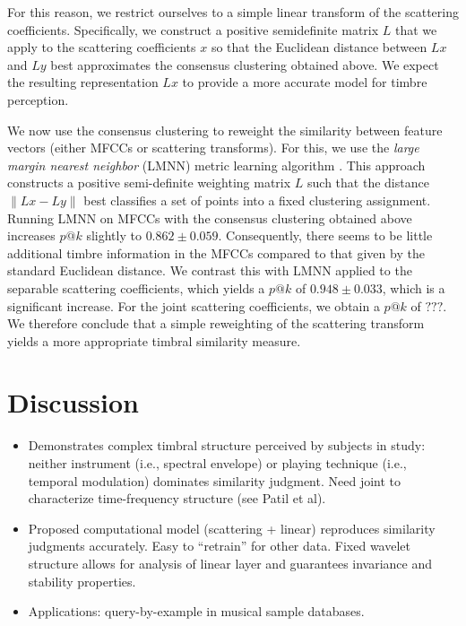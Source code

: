 \documentclass[10pt,letterpaper]{article}
\makeatletter
\newcommand{\patk}{p\mathrm{@}k}
\makeatother
\begin{document}
For this reason, we restrict ourselves to a simple linear transform of the scattering coefficients.
Specifically, we construct a positive semidefinite matrix $L$ that we apply to the scattering coefficients $x$ so that the Euclidean distance between $Lx$ and $Ly$ best approximates the consensus clustering obtained above.
We expect the resulting representation $Lx$ to provide a more accurate model for timbre perception.

We now use the consensus clustering to reweight the similarity between feature vectors (either MFCCs or scattering transforms).
For this, we use the \emph{large margin nearest neighbor} (LMNN) metric learning algorithm \cite{weinberger2006distance, weinberger2009distance}.
This approach constructs a positive semi-definite weighting matrix $L$ such that the distance $\|Lx - Ly\|$ best classifies a set of points into a fixed clustering assignment.
Running LMNN on MFCCs with the consensus clustering obtained above increases $\patk$ slightly to $0.862 \pm 0.059$.
Consequently, there seems to be little additional timbre information in the MFCCs compared to that given by the standard Euclidean distance.
We contrast this with LMNN applied to the separable scattering coefficients, which yields a $\patk$ of $0.948 \pm 0.033$, which is a significant increase.
For the joint scattering coefficients, we obtain a $\patk$ of $???$.
We therefore conclude that a simple reweighting of the scattering transform yields a more appropriate timbral similarity measure.

\section*{Discussion}
\label{sec:discussion}

\begin{itemize}
\item Demonstrates complex timbral structure perceived by subjects in study: neither instrument (i.e., spectral envelope) or playing technique (i.e., temporal modulation) dominates similarity judgment. Need joint to characterize time-frequency structure (see Patil et al).
\item Proposed computational model (scattering + linear) reproduces similarity judgments accurately. Easy to ``retrain'' for other data. Fixed wavelet structure allows for analysis of linear layer and guarantees invariance and stability properties.
\item Applications: query-by-example in musical sample databases.
\end{itemize}
\end{document}
